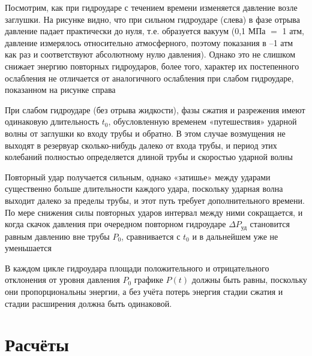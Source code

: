 \documentclass[a4paper, 14pt]{article}
\begin{document}
    Посмотрим, как при гидроударе с течением времени изменяется давление возле заглушки.
    На рисунке видно, что при сильном гидроударе (слева) в фазе отрыва давление падает практически до нуля, т.е.
    образуется вакуум (0,1 МПа $=$ 1 атм, давление измерялось относительно атмосферного, поэтому показания в –1 атм
    как раз и соответствуют абсолютному нулю давления).
    Однако это не слишком снижает энергию повторных гидроударов, более того, характер их постепенного ослабления не
    отличается от аналогичного ослабления при слабом гидроударе, показанном на рисунке справа

    При слабом гидроударе (без отрыва жидкости), фазы сжатия и разрежения имеют одинаковую длительность $t_0$,
    обусловленную временем «путешествия» ударной волны от заглушки ко входу трубы и обратно.
    В этом случае возмущения не выходят в резервуар сколько-нибудь далеко от входа трубы, и период этих колебаний
    полностью определяется длиной трубы и скоростью ударной волны

    Повторный удар получается сильным, однако «затишье» между ударами существенно больше длительности каждого удара,
    поскольку ударная волна выходит далеко за пределы трубы, и этот путь требует дополнительного времени.
    По мере снижения силы повторных ударов интервал между ними сокращается, и когда скачок давления при очередном
    повторном гидроударе $\Delta P_{\text{уд}}$ становится равным давлению вне трубы $P_0$, сравнивается с $t_0$ и в
    дальнейшем уже не уменьшается

    В каждом цикле гидроудара площади положительного и отрицательного отклонения от уровня давления $P_0$ графике $P(
    t)$ должны быть равны, поскольку они пропорциональны энергии, а без учёта потерь энергия стадии сжатия и стадии
    расширения должна быть одинаковой.


    \section{Расчёты}
\end{document}
